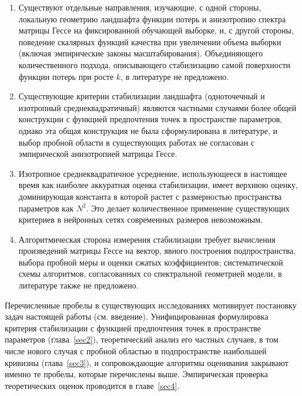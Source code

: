 \begin{enumerate}
    \item Существуют отдельные направления, изучающие, с одной стороны, локальную геометрию ландшафта функции потерь и анизотропию спектра матрицы Гессе на фиксированной обучающей выборке, и, с другой стороны, поведение скалярных функций качества при увеличении объема выборки (включая эмпирические законы масштабирования). Объединяющего количественного подхода, описывающего стабилизацию самой поверхности функции потерь при росте $k$, в литературе не предложено.
    \item Существующие критерии стабилизации ландшафта (одноточечный и изотропный среднеквадратичный) являются частными случаями более общей конструкции с функцией предпочтения точек в пространстве параметров, однако эта общая конструкция не была сформулирована в литературе, и выбор пробной области в существующих работах не согласован с эмпирической анизотропией матрицы Гессе.
    \item Изотропное среднеквадратичное усреднение, использующееся в настоящее время как наиболее аккуратная оценка стабилизации, имеет верхнюю оценку, доминирующая константа в которой растет с размерностью пространства параметров как $N^2$. Это делает количественное применение существующих критериев в нейронных сетях современных размеров невозможным.
    \item Алгоритмическая сторона измерения стабилизации требует вычисления произведений матрицы Гессе на вектор, явного построения подпространства, выбора пробной меры и оценки сжатых коэффициентов; систематической схемы алгоритмов, согласованных со спектральной геометрией модели, в литературе также не предложено.
\end{enumerate}

Перечисленные пробелы в существующих исследованиях мотивирует постановку задач настоящей работы (см. введение). Унифицированная формулировка критерия стабилизации с функцией предпочтения точек в пространстве параметров (глава~\ref{sec2}), теоретический анализ его частных случаев, в том числе нового случая с пробной областью в подпространстве наибольшей кривизны (глава~\ref{sec3}), и сопровождающие алгоритмы оценивания закрывают именно те пробелы, которые перечислены выше. Эмпирическая проверка теоретических оценок проводится в главе~\ref{sec4}.

